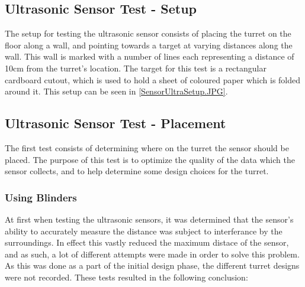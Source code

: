 
\subsection{Ultrasonic Sensor Test - Setup}\label{UltraTestSetup}
The setup for testing the ultrasonic sensor consists of placing the turret on
the floor along a wall, and pointing towards a target at varying distances along
the wall. This wall is marked with a number of lines each representing a
distance of 10cm from the turret's location. The target for this test is a
rectangular cardboard cutout, which is used to hold a sheet of coloured paper
which is folded around it. This setup can be seen in
\autoref{SensorUltraSetup.JPG}.


\subsection{Ultrasonic Sensor Test - Placement}\label{UltraTestPlacement}
The first test consists of determining where on the turret the sensor should be
placed. The purpose of this test is to optimize the quality of the data which
the sensor collects, and to help determine some design choices for the
turret.\nl


\subsubsection{Using Blinders}
At first when testing the ultrasonic sensors, it was determined that the
sensor's ability to accurately measure the distance was subject to interferance
by the surroundings. In effect this vastly reduced the maximum distace of the
sensor, and as such, a lot of different attempts were made in order to solve
this problem. As this was done as a part of the initial design phase, the
different turret designs were not recorded. These tests resulted in the
following conclusion:\nl

